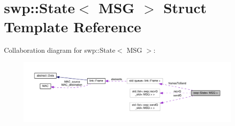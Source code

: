 \hypertarget{structswp_1_1State}{}\section{swp\+:\+:State$<$ M\+SG $>$ Struct Template Reference}
\label{structswp_1_1State}


Collaboration diagram for swp\+:\+:State$<$ M\+SG $>$\+:
\nopagebreak
\begin{figure}[H]
\begin{center}
\leavevmode
\includegraphics[width=350pt]{structswp_1_1State__coll__graph}
\end{center}
\end{figure}

